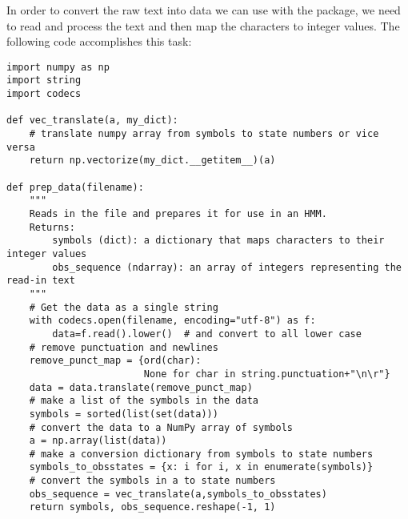 In order to convert the raw text into data we can use with the  package, we need to read and process the text and then map the characters to integer values.
The following code accomplishes this task:
\begin{lstlisting}
import numpy as np
import string
import codecs

def vec_translate(a, my_dict):
    # translate numpy array from symbols to state numbers or vice versa
    return np.vectorize(my_dict.__getitem__)(a)

def prep_data(filename):
    """
    Reads in the file and prepares it for use in an HMM.
    Returns:
        symbols (dict): a dictionary that maps characters to their integer values
        obs_sequence (ndarray): an array of integers representing the read-in text
    """
    # Get the data as a single string
    with codecs.open(filename, encoding="utf-8") as f:
        data=f.read().lower()  # and convert to all lower case
    # remove punctuation and newlines
    remove_punct_map = {ord(char):
                        None for char in string.punctuation+"\n\r"}
    data = data.translate(remove_punct_map)
    # make a list of the symbols in the data
    symbols = sorted(list(set(data)))
    # convert the data to a NumPy array of symbols
    a = np.array(list(data))
    # make a conversion dictionary from symbols to state numbers
    symbols_to_obsstates = {x: i for i, x in enumerate(symbols)}
    # convert the symbols in a to state numbers
    obs_sequence = vec_translate(a,symbols_to_obsstates)
    return symbols, obs_sequence.reshape(-1, 1)
\end{lstlisting}

